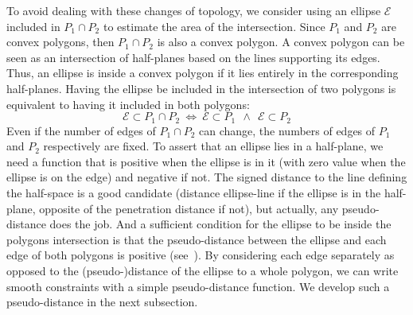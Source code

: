 To avoid dealing with these changes of topology, we consider using an ellipse $\mathcal{E}$ included in $P_1 \cap P_2$ to estimate the area of the intersection. Since $P_1$ and $P_2$ are convex polygons, then $P_1 \cap P_2$ is also a convex polygon. A convex polygon can be seen as an intersection of half-planes based on the lines supporting its edges. Thus, an ellipse is inside a convex polygon if it lies entirely in the corresponding half-planes. Having the ellipse be included in the intersection of two polygons is equivalent to having it included in both polygons:
\begin{equation}
\mathcal{E} \subset P_1 \cap P_2 \ \Longleftrightarrow \ 
\mathcal{E} \subset P_1 \ \ \wedge \ \  \mathcal{E} \subset P_2
\end{equation}
Even if the number of edges of $P_1 \cap P_2$ can change, the numbers of edges of $P_1$ and $P_2$ respectively are fixed. 
To assert that an ellipse lies in a half-plane, we need a function that is positive when the ellipse is in it (with zero value when the ellipse is on the edge) and negative if not. The signed distance to the line defining the half-space is a good candidate (distance ellipse-line if the ellipse is in the half-plane, opposite of the penetration distance if not), but actually, any pseudo-distance does the job. And a sufficient condition for the ellipse to be inside the polygons intersection is that the pseudo-distance between the ellipse and each edge of both polygons is positive (see~). By considering each edge separately as opposed to the (pseudo-)distance of the ellipse to a whole polygon, we can write smooth constraints with a simple pseudo-distance function. We develop such a pseudo-distance in the next subsection. 
